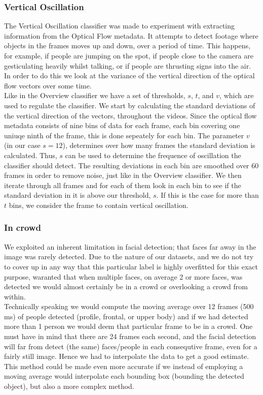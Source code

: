 \subsubsection{Vertical Oscillation}
%
%
The Vertical Oscillation classifier was made to experiment with extracting information from the Optical Flow metadata. It attempts to detect footage where objects in the frames moves up and down, over a period of time. This happens, for example, if people are jumping on the spot, if people close to the camera are gesticulating heavily whilst talking, or if people are thrusting signs into the air. In order to do this we look at the variance of the vertical direction of the optical flow vectors over some time.\\
Like in the Overview classifier we have a set of thresholds, $s$, $t$, and $v$, which are used to regulate the classifier. We start by calculating the standard deviations of the vertical direction of the vectors, throughout the videos. Since the optical flow metadata consists of nine bins of data for each frame, each bin covering one uniuqe ninth of the frame, this is done sepeately for each bin. The parameter $v$ (in our case $s = 12$), determines over how many frames the standard deviation is calculated. Thus, $s$ can be used to determine the frequence of oscillation the classifier should detect. The resulting deviations in each bin are smoothed over 60 frames in order to remove noise, just like in the Overview classifier. We then iterate through all frames and for each of them look in each bin to see if the standard deviation in it is above our threshold, $s$. If this is the case for more than $t$ bins, we consider the frame to contain vertical oscillation.
%
%
\subsubsection{In crowd}
%
We exploited an inherent limitation in facial detection; that faces far away in the image was rarely detected. Due to the nature of our datasets, and we do not try to cover up in any way that this particular label is highly overfitted for this exact purpose, waranted that when multiple faces, on average 2 or more faces, was detected we would almost certainly be in a crowd or overlooking a crowd from within.\\
Technically speaking we would compute the moving average over 12 frames (500 ms) of people detected (profile, frontal, or upper body) and if we had detected more than 1 person we would deem that particular frame to be in a crowd. One must have in mind that there are 24 frames each second, and the facial detection will far from detect (the same) faces/people in each consequtive frame, even for a fairly still image. Hence we had to interpolate the data to get a good estimate.\\
This method could be made even more accurate if we instead of employing a moving average would interpolate each bounding box (bounding the detected object), but also a more complex method.
%
